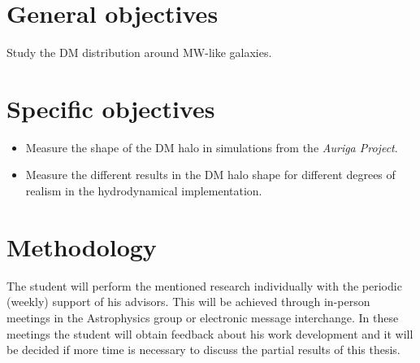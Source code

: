 \documentclass[12pt]{article}
\begin{document}
\section{General objectives}


Study the DM distribution around MW-like galaxies.

\section{Specific objectives}


\begin{itemize}
	\item Measure the shape of the DM halo in simulations from the \emph{Auriga Project}.

	\item Measure the different results in the DM halo shape for different degrees of realism in the hydrodynamical implementation.	
\end{itemize}

\section{Methodology}




The student will perform the mentioned research individually with the periodic (weekly) support of his advisors. This will be achieved through in-person meetings in the Astrophysics group or electronic message interchange. 
In these meetings the student will obtain feedback about his work development and it will be decided if more time is necessary to discuss the partial results of this thesis. \\
\end{document}

